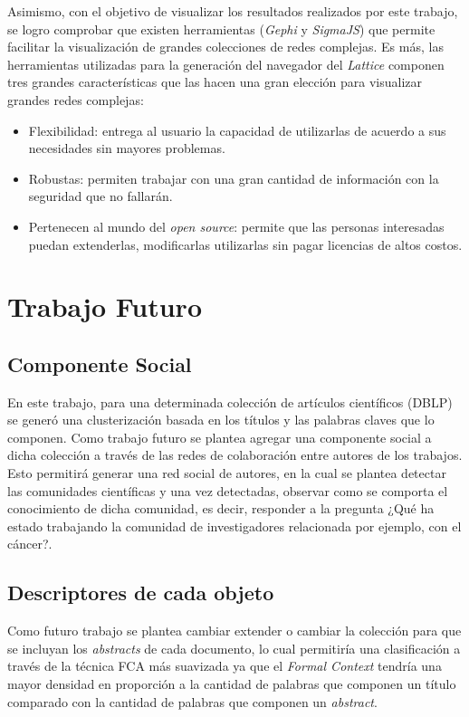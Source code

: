 \documentclass[12pt,oneside,letterpaper]{book}
\newcommand{\eng}[1]{\textit{#1}\xspace}			%
\newcommand{\abr}[1]{\textsc{#1}\xspace}           %
\theoremstyle{definition}
\begin{document}
Asimismo, con el objetivo de visualizar los resultados realizados por este trabajo, se logro comprobar que existen herramientas (\eng{Gephi} y \eng{SigmaJS}) que permite facilitar la visualización de grandes colecciones de redes complejas. Es más, las herramientas utilizadas para la generación del navegador del \eng{Lattice} componen tres grandes características que las hacen una gran elección para visualizar grandes redes complejas:

\begin{itemize}
	\item Flexibilidad: entrega al usuario la capacidad de utilizarlas de acuerdo a sus necesidades sin mayores problemas.
	\item Robustas: permiten trabajar con una gran cantidad de información con la seguridad que no fallarán. 
   	\item Pertenecen al mundo del \eng{open source}: permite que las personas interesadas puedan extenderlas, modificarlas utilizarlas sin pagar licencias de altos costos.
   \end{itemize}   

\chapter{Trabajo Futuro}
\section{Componente Social}
En este trabajo, para una determinada colección de artículos científicos (\abr{DBLP}) se generó una clusterización basada en los títulos y las palabras claves que lo componen. Como trabajo futuro se plantea agregar una componente social a dicha colección a través de las redes de colaboración entre autores de los trabajos. Esto permitirá generar una red social de autores, en la cual se plantea detectar las comunidades científicas y una vez detectadas, observar como se comporta el conocimiento de dicha comunidad, es decir, responder a la pregunta ¿Qué ha estado trabajando la comunidad de investigadores relacionada por ejemplo, con el cáncer?.

\section{Descriptores de cada objeto}
Como futuro trabajo se plantea cambiar extender o cambiar la colección para que se incluyan los \eng{abstracts} de cada documento, lo cual permitiría una clasificación a través de la técnica {FCA} más suavizada ya que el \eng{Formal Context} tendría una mayor densidad en proporción a la cantidad de palabras que componen un título comparado con la cantidad de palabras que componen un \eng{abstract}.
\end{document}
